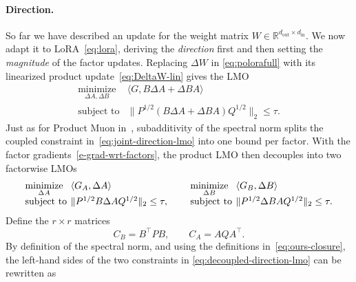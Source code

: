 \documentclass[11pt]{article}
\newcommand{\R}{\mathbb{R}}
\newcommand{\ip}[1]{\langle #1 \rangle}
\newcommand{\norm}[1]{\| #1\|}
\theoremstyle{plain}
\theoremstyle{definition}
\theoremstyle{remark}
\theoremstyle{definition}
\begin{document}
\paragraph{Direction.}
So far we have described an update for the weight matrix $W \in \R^{d_{\mathrm{out}} \times d_{\mathrm{in}}}$. We now adapt it to LoRA~\eqref{eq:lora}, deriving the \emph{direction} first and then setting the \emph{magnitude} of the factor updates. Replacing $\Delta W$ in \eqref{eq:polorafull} with its linearized product update~\eqref{eq:DeltaW-lin} gives the LMO
\begin{equation}
    \begin{array}{ll}
    \underset{\Delta A,\Delta B}{\mathrm{minimize}} &
    \ip{G, B\Delta A+\Delta B A} \\[2pt]
    \mbox{subject to} &
    \norm{P^{1/2}(B\Delta A+\Delta B A)Q^{1/2}}_2
    \le \tau.
    \end{array}
    \label{eq:joint-direction-lmo}
  \end{equation}
Just as for Product Muon in~, subadditivity of the spectral norm splits the coupled constraint in~\eqref{eq:joint-direction-lmo} into one bound per factor. With the factor gradients~\eqref{e-grad-wrt-factors}, the product LMO then decouples into two factorwise LMOs
\begin{equation}
\setlength{\arraycolsep}{2pt}
\begin{array}{@{}c@{\qquad}c@{}}
\begin{array}{ll}
\underset{\Delta A}{\mathrm{minimize}} &
\ip{G_A,\Delta A} \\[2pt]
\mbox{subject to} &
\norm{P^{1/2}B\Delta A Q^{1/2}}_2 \le \tau ,
\end{array}
&
\begin{array}{ll}
\underset{\Delta B}{\mathrm{minimize}} &
\ip{G_B,\Delta B} \\[2pt]
\mbox{subject to} &
\norm{P^{1/2}\Delta B A Q^{1/2}}_2 \le \tau .
\end{array}
\end{array}
\label{eq:decoupled-direction-lmo}
\end{equation}
Define the $r\times r$ matrices
\begin{equation}
C_B = B^\top P B,
\qquad
C_A = A Q A^\top .
\label{eq:ours-closure}
\end{equation}
By definition of the spectral norm, and using the definitions in~\eqref{eq:ours-closure}, the left-hand sides of the two constraints in \eqref{eq:decoupled-direction-lmo} can be rewritten as
\end{document}

